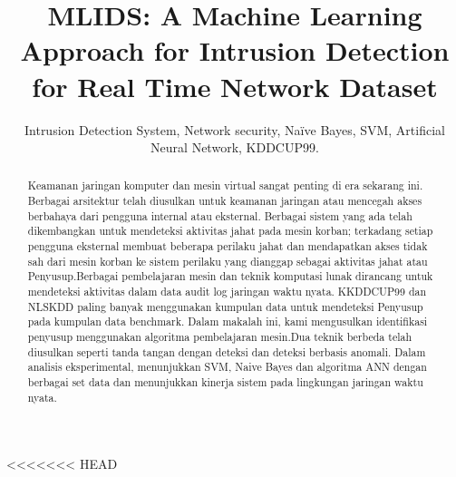 \documentclass[conference]{IEEEtran}
\begin{document}
\title{MLIDS: A Machine Learning Approach for Intrusion Detection for Real Time Network Dataset}

<<<<<<< HEAD
\author{
\author{
}

\maketitle

\begin{abstract}
Keamanan jaringan komputer dan mesin virtual sangat penting di era sekarang ini. Berbagai arsitektur telah diusulkan untuk keamanan jaringan atau mencegah akses berbahaya dari pengguna internal atau eksternal. Berbagai sistem yang ada telah dikembangkan untuk mendeteksi aktivitas jahat pada mesin korban; terkadang setiap pengguna eksternal membuat beberapa perilaku jahat dan mendapatkan akses tidak sah dari mesin korban ke sistem perilaku yang dianggap sebagai aktivitas jahat atau Penyusup.Berbagai pembelajaran mesin dan teknik komputasi lunak dirancang untuk mendeteksi aktivitas dalam data audit log jaringan waktu nyata. KKDDCUP99 dan NLSKDD paling banyak menggunakan kumpulan data untuk mendeteksi Penyusup pada kumpulan data benchmark. Dalam makalah ini, kami mengusulkan identifikasi penyusup menggunakan algoritma pembelajaran mesin.Dua teknik berbeda telah diusulkan seperti tanda tangan dengan deteksi dan deteksi berbasis anomali. Dalam analisis eksperimental, menunjukkan SVM, Naive Bayes dan algoritma ANN dengan berbagai set data dan menunjukkan kinerja sistem pada lingkungan jaringan waktu nyata.
\end{abstract}

\begin{IEEEkeywords}
Intrusion Detection System, Network security, Naïve Bayes, SVM, Artificial Neural Network, KDDCUP99.
\end{IEEEkeywords}

}
\end{document}
